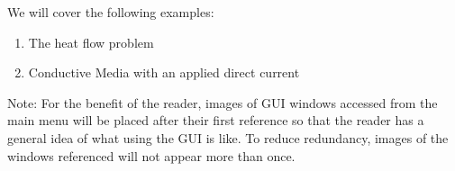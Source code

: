 \documentclass{amsart}
\theoremstyle{definition}
\begin{document}
\par
\bigskip
\noindent \Large We will cover the following examples:
\normalsize
\begin{enumerate} 
\item The heat flow problem \label{Heat Flow}
\item Conductive Media with an applied direct current \label{Electrostatics}
\end{enumerate}\vspace{12pt}

Note: For the benefit of the reader, images of GUI windows accessed from the main menu will be placed after their first reference so that the reader has a general idea of what using the GUI is like. To reduce redundancy, images of the windows referenced will not appear more than once.
\newpage
\end{document}
